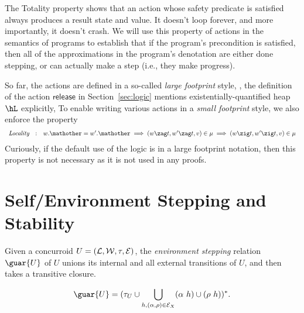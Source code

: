 The Totality property shows that an action whose safety predicate is
satisfied always produces a result state and value. It doesn't loop
forever, and more importantly, it doesn't crash. We will use this
property of actions in the semantics of programs to establish that if
the program's precondition is satisfied, then all of the
approximations in the program's denotation are either done stepping,
or can actually make a step (i.e., they make progress).

So far, the actions are defined in a so-called \emph{large footprint}
style, \eg, the definition of the action $\mathsf{release}$ in
Section~\ref{sec:logic} mentions existentially-quantified heap $\hL$
explicitly,
%
To enable writing various actions in a \emph{small footprint} style,
we also enforce the property {\small
\[
\begin{array}[t]{rcl}
\textit{Locality} & : & w.\mathother = w'.\mathother \implies (w \zag t, w' \zag t, v) \in \mu \implies (w \zig t, w' \zig t, v) \in \mu
\end{array}
\]}
Curiously, if the default use of the logic is in a large footprint
notation, then this property is not necessary as it is not used in any
proofs.
%
%


\section{Self/Environment Stepping and Stability}
\label{sec:stability}

\begin{definition}
\label{def:guarantee}

Given a concurroid $U = ({\cal L}, {\cal W}, \tau, {\cal E})$, the
\emph{environment stepping} relation $\guar{U}$ of $U$ unions its
internal and all external transitions of $U$, and then takes a
transitive closure.

{\small
\[
  \guar{U} = (\tau_U \cup \bigcup_{h, (\alpha, \rho)\in {\cal E}_X} (\alpha~h) \cup (\rho~h))^*.
\]
}
\end{definition}


